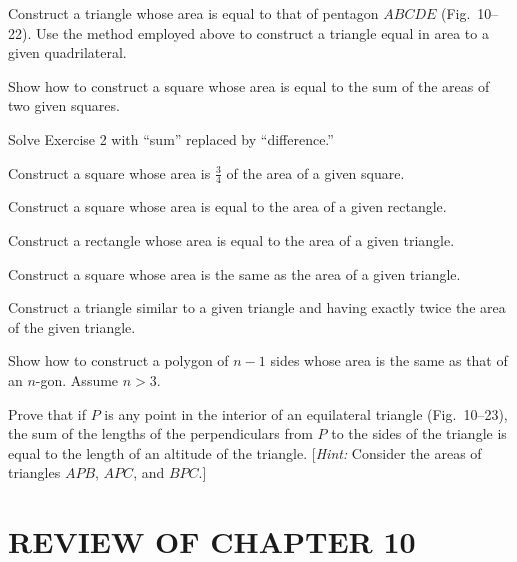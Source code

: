 \documentclass[11pt]{book}
\theoremstyle{bkplain}
\theoremstyle{XIplainnote}
\theoremstyle{bkplain}
\theoremstyle{bkplain}
\begin{document}
\FIGXTWENTYONE

\begin{exercisecols}
\begin{exlist}
\item Construct a triangle whose area is equal to that of pentagon $ABCDE$
  (Fig.~10--22). Use the method employed above to construct a triangle equal in
  area to a given quadrilateral.
\exfig{\FIGXTWENTYTWO}
\item Show how to construct a square whose area is equal to the sum of the
  areas of two given squares.
\item Solve Exercise 2 with ``sum'' replaced by ``difference.''
\item Construct a square whose area is $\frac{3}{4}$ of the area of a given
  square.
\item Construct a square whose area is equal to the area of a given rectangle.
\item Construct a rectangle whose area is equal to the area of a given
  triangle.
\item Construct a square whose area is the same as the area of a given
  triangle.
\item Construct a triangle similar to a given triangle and having exactly twice
  the area of the given triangle.
\item Show how to construct a polygon of $n - 1$ sides whose area is the same
  as that of an $n$-gon. Assume $n > 3$.
\item[\stex 10.] Prove that if $P$ is any point in the interior of an
  equilateral triangle (Fig.~10--23), the sum of the lengths of the
  perpendiculars from $P$ to the sides of the triangle is equal to the length
  of an altitude of the triangle. [\emph{Hint:} Consider the areas of triangles
  $APB$, $APC$, and $BPC$.]
\exfig{\FIGXTWENTYTHREE}
\end{exlist}
\end{exercisecols}

\section*{REVIEW OF CHAPTER 10}
\end{document}
